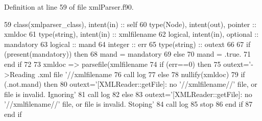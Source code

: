 Definition at line 59 of file xml\+Parser.\+f90.


\begin{DoxyCode}
59     \textcolor{keywordtype}{class}(xmlparser\_class), \textcolor{keywordtype}{intent(in)} :: self
60     \textcolor{keywordtype}{type}(Node), \textcolor{keywordtype}{intent(out)}, \textcolor{keywordtype}{pointer} :: xmldoc
61     \textcolor{keywordtype}{type}(string), \textcolor{keywordtype}{intent(in)} :: xmlfilename
62     \textcolor{keywordtype}{logical}, \textcolor{keywordtype}{intent(in)}, \textcolor{keywordtype}{optional} :: mandatory
63     \textcolor{keywordtype}{logical} :: mand
64     \textcolor{keywordtype}{integer} :: err
65     \textcolor{keywordtype}{type}(string) :: outext
66     
67     \textcolor{keywordflow}{if} (\textcolor{keyword}{present}(mandatory)) \textcolor{keywordflow}{then}
68         mand = mandatory
69     \textcolor{keywordflow}{else}
70         mand = .true.
71 \textcolor{keywordflow}{    end if}    
72     
73     xmldoc => parsefile(xmlfilename%
74     \textcolor{keywordflow}{if} (err==0) \textcolor{keywordflow}{then}
75         outext=\textcolor{stringliteral}{'->Reading .xml file '}//xmlfilename
76         \textcolor{keyword}{call }log%
77     \textcolor{keywordflow}{else}
78         \textcolor{keyword}{nullify}(xmldoc)
79         \textcolor{keywordflow}{if} (.not.mand) \textcolor{keywordflow}{then}            
80             outext=\textcolor{stringliteral}{'[XMLReader::getFile]: no '}//xmlfilename//\textcolor{stringliteral}{' file, or file is invalid. Ignoring'}
81             \textcolor{keyword}{call }log%
82         \textcolor{keywordflow}{else}
83             outext=\textcolor{stringliteral}{'[XMLReader::getFile]: no '}//xmlfilename//\textcolor{stringliteral}{' file, or file is invalid. Stoping'}
84             \textcolor{keyword}{call }log%
85             stop
86 \textcolor{keywordflow}{        end if}
87 \textcolor{keywordflow}{    end if}
\end{DoxyCode}
\mbox{\label{namespacexmlparser__mod_a3e977c7792b08b009a09cc1f7fb4f80a}} 
